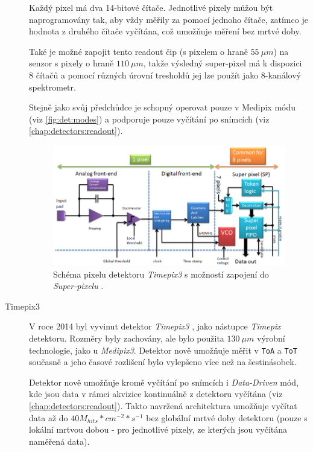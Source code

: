 \begin{description}
	Každý pixel má dva 14-bitové čítače. Jednotlivé pixely můžou být naprogramovány tak, aby vždy měřily za pomocí jednoho čítače, zatímco je hodnota z druhého čítače vyčítána, což umožňuje měření bez mrtvé doby.

	Také je možné zapojit tento readout čip (s pixelem o hraně $55~\mu m$) na senzor s pixely o hraně $110~\mu m$, takže výsledný super-pixel má k dispozici 8 čítačů a pomocí různých úrovní tresholdů jej lze použít jako 8-kanálový spektrometr.

	Stejně jako svůj předchůdce je schopný operovat pouze v Medipix módu (viz \ref{fig:det:modes}) a podporuje pouze vyčítání po snímcích (viz \ref{chap:detectors:readout}).
	
	\begin{figure}
		\begin{center}
			\includegraphics[width=15cm]{figures/det_timepix3_schema.png}
			\caption{Schéma pixelu detektoru \textit{Timepix3} s možností zapojení do \textit{Super-pixelu} \cite{timepix3}.}
			\label{fig:det:medipix_overview:timepix3_schema}
		\end{center}
	\end{figure}

	\item[Timepix3] V roce 2014 byl vyvinut detektor \textit{Timepix3} \cite{timepix3}, jako nástupce \textit{Timepix} detektoru. Rozměry byly zachovány, ale bylo použita $130~\mu m$ výrobní technologie, jako u \textit{Medipix3}. Detektor nově umožňuje měřit v \texttt{ToA} a \texttt{ToT} současně a jeho časové rozlišení bylo vylepšeno více než na šestinásobek.

	Detektor nově umožňuje kromě vyčítání po snímcích i \textit{Data-Driven} mód, kde jsou data v rámci akvizice kontinuálně z detektoru vyčítána (viz \ref{chap:detectors:readout}). Takto navržená architektura umožňuje vyčítat data až do $40M_{hits}*cm^{-2}*s^{-1}$ bez globální mrtvé doby detektoru (pouze s lokální mrtvou dobou - pro jednotlivé pixely, ze kterých jsou vyčítána naměřená data).

\end{description}

